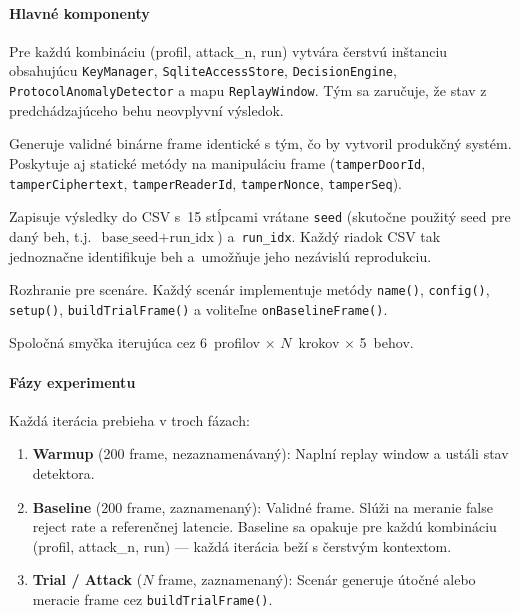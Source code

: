 \paragraph{Hlavné komponenty}

\begin{description}[leftmargin=*,itemsep=2pt]
  \item[\texttt{ExperimentContext}:] Pre každú kombináciu (profil, attack\_n, run) vytvára čerstvú inštanciu obsahujúcu \texttt{KeyManager}, \texttt{SqliteAccessStore}, \texttt{DecisionEngine}, \texttt{ProtocolAnomalyDetector} a mapu \texttt{ReplayWindow}. Tým sa zaručuje, že stav z predchádzajúceho behu neovplyvní výsledok.
  \item[\texttt{FrameFactory}:] Generuje validné binárne frame identické s tým, čo by vytvoril produkčný systém. Poskytuje aj statické metódy na manipuláciu frame (\texttt{tamperDoorId}, \texttt{tamperCiphertext}, \texttt{tamperReaderId}, \texttt{tamperNonce}, \texttt{tamperSeq}).
  \item[\texttt{MetricsCollector}:] Zapisuje výsledky do CSV s~15 stĺpcami vrátane \texttt{seed} (skutočne použitý seed pre daný beh, t.j.\ $\text{base\_seed} + \text{run\_idx}$) a~\texttt{run\_idx}. Každý riadok CSV tak jednoznačne identifikuje beh a~umožňuje jeho nezávislú reprodukciu.
  \item[\texttt{IScenario}:] Rozhranie pre scenáre. Každý scenár implementuje metódy \texttt{name()}, \texttt{config()}, \texttt{setup()}, \texttt{buildTrialFrame()} a voliteľne \texttt{onBaselineFrame()}.
  \item[\texttt{runScenario()}:] Spoločná smyčka iterujúca cez 6~profilov $\times$ $N$~krokov $\times$ 5~behov.
\end{description}

\paragraph{Fázy experimentu}

Každá iterácia prebieha v troch fázach:

\begin{enumerate}[leftmargin=*,itemsep=2pt]
  \item \textbf{Warmup} (200 frame, nezaznamenávaný): Naplní replay window a ustáli stav detektora.
  \item \textbf{Baseline} (200 frame, zaznamenaný): Validné frame. Slúži na meranie false reject rate a referenčnej latencie. Baseline sa opakuje pre každú kombináciu (profil, attack\_n, run) --- každá iterácia beží s čerstvým kontextom.
  \item \textbf{Trial / Attack} ($N$ frame, zaznamenaný): Scenár generuje útočné alebo meracie frame cez \texttt{buildTrialFrame()}.
\end{enumerate}

